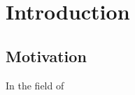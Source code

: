 \chapter{Introduction}
\label{ch:intro}


%
%
\section{Motivation}
\label{sec:intro:motivation}

In the field of 
